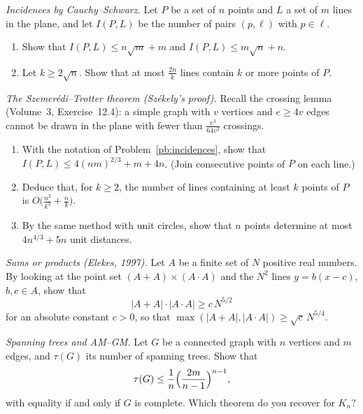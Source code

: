 \begin{exercise}[$\star\star$]\label{pb:incidences}
\emph{Incidences by Cauchy--Schwarz.} Let $P$ be a set of $n$ points and $L$ a set of $m$ lines in the plane, and let $I(P,L)$ be the
number of pairs $(p,\ell)$ with $p\in\ell$.
\begin{enumerate}[label=(\alph*)]
\item Show that $I(P,L)\le n\sqrt m+m$ and $I(P,L)\le m\sqrt n+n$.
\item Let $k\ge2\sqrt n$. Show that at most $\frac{2n}k$ lines contain $k$ or more points of $P$.
\end{enumerate}
\end{exercise}

\begin{exercise}[$\star\star\star$]\label{pb:szemereditrotter}
\emph{The Szemerédi--Trotter theorem (Székely's proof).} Recall the crossing lemma (Volume~3, Exercise~12.4): a simple graph with
$v$ vertices and $e\ge4v$ edges cannot be drawn in the plane with fewer than $\frac{e^3}{64v^2}$ crossings.
\begin{enumerate}[label=(\alph*)]
\item With the notation of Problem~\ref{pb:incidences}, show that $I(P,L)\le4(nm)^{2/3}+m+4n$. (Join consecutive points of $P$ on
each line.)
\item Deduce that, for $k\ge2$, the number of lines containing at least $k$ points of $P$ is $O\bigl(\frac{n^2}{k^3}+\frac nk\bigr)$.
\item By the same method with unit circles, show that $n$ points determine at most $4n^{4/3}+5n$ unit distances.
\end{enumerate}
\end{exercise}

\begin{exercise}[$\star\star$]\label{pb:sumproduct}
\emph{Sums or products (Elekes, 1997).} Let $A$ be a finite set of $N$ positive real numbers. By looking at the point set
$(A+A)\times(A\cdot A)$ and the $N^2$ lines $y=b(x-c)$, $b,c\in A$, show that
\[
|A+A|\cdot|A\cdot A|\ge c\,N^{5/2}
\]
for an absolute constant $c>0$, so that $\max(|A+A|,|A\cdot A|)\ge\sqrt c\,N^{5/4}$.
\end{exercise}

\begin{exercise}[$\star$]\label{pb:treebound}
\emph{Spanning trees and AM--GM.} Let $G$ be a connected graph with $n$ vertices and $m$ edges, and $\tau(G)$ its number of spanning
trees. Show that
\[
\tau(G)\le\frac1n\Bigl(\frac{2m}{n-1}\Bigr)^{n-1},
\]
with equality if and only if $G$ is complete. Which theorem do you recover for $K_n$?
\end{exercise}

